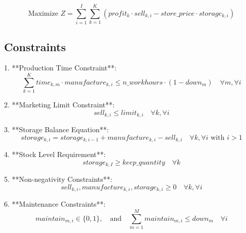 \documentclass{article}
\begin{document}
\[
\text{Maximize } Z = \sum_{i=1}^I \sum_{k=1}^K (profit_k \cdot sell_{k,i} - store\_price \cdot storage_{k,i})
\]

\subsection*{Constraints}

1. **Production Time Constraint**:
   \[
   \sum_{k=1}^K time_{k,m} \cdot manufacture_{k,i} \leq n\_workhours \cdot (1 - down_m) \quad \forall m, \forall i
   \]

2. **Marketing Limit Constraint**:
   \[
   sell_{k,i} \leq limit_{k,i} \quad \forall k, \forall i
   \]

3. **Storage Balance Equation**:
   \[
   storage_{k,i} = storage_{k,i-1} + manufacture_{k,i} - sell_{k,i} \quad \forall k, \forall i \text{ with } i > 1
   \]

4. **Stock Level Requirement**:
   \[
   storage_{k,I} \geq keep\_quantity \quad \forall k
   \]

5. **Non-negativity Constraints**:
   \[
   sell_{k,i}, manufacture_{k,i}, storage_{k,i} \geq 0 \quad \forall k, \forall i
   \]

6. **Maintenance Constraints**:
   \[
   maintain_{m,i} \in \{0, 1\}, \quad \text{and} \quad \sum_{m=1}^M maintain_{m,i} \leq down_m \quad \forall i
   \]
\end{document}
